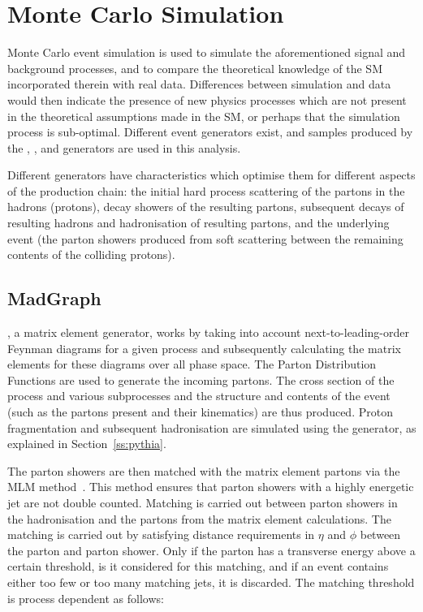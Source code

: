 \section{Monte Carlo Simulation}
\label{s:monte_carlo_simulation}

Monte Carlo event simulation is used to simulate the aforementioned signal and background processes, and to
compare the theoretical knowledge of the SM incorporated therein with real data. Differences
between simulation and data would then indicate the presence of new physics processes which are not present in
the theoretical assumptions made in the SM, or perhaps that the simulation process is sub-optimal.
Different event generators exist, and samples produced by the \MADGRAPH, \PYTHIA, \POWHEG and \HERWIG
generators are used in this analysis.

Different generators have characteristics which optimise them for different aspects of the production chain:
the initial hard process scattering of the partons in the hadrons (protons), decay showers of the resulting
partons, subsequent decays of resulting hadrons and hadronisation of resulting partons, and the underlying
event (the parton showers produced from soft scattering between the remaining contents of the colliding
protons). 

\subsection{MadGraph}
\label{ss:madgraph}
\MADGRAPH \cite{madgraph5}, a matrix element generator, works by taking into account next-to-leading-order
Feynman diagrams for a given process and subsequently calculating the matrix elements for these diagrams over
all phase space. The Parton Distribution Functions are used to generate the incoming partons.
The cross section of the process and various subprocesses and the structure and contents of the event (such as
the partons present and their kinematics) are thus produced. %
Proton fragmentation and subsequent hadronisation are simulated using the \PYTHIA generator, as explained in
Section~\ref{ss:pythia}.

The parton showers are then matched with the matrix element partons via the MLM method~\cite{mlm}. This
method ensures that parton showers with a highly energetic jet are not double counted. Matching is carried out
between parton showers in the hadronisation and the partons from the matrix element calculations. The matching
is carried out by satisfying distance requirements in $\eta$ and $\phi$ between the parton and parton shower.
Only if the parton has a transverse energy above a certain threshold, is it considered for this matching, and
if an event contains either too few or too many matching jets, it is discarded. The matching threshold is
process dependent as follows:

